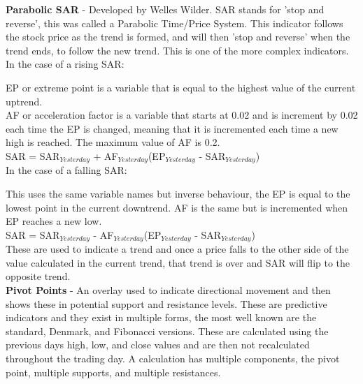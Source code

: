 \documentclass[12pt,a4paper]{article}
\begin{document}
\iffalse
[]
\fi

\noindent
\textbf{Parabolic SAR} - Developed by Welles Wilder. SAR stands for 'stop and reverse', this was called a Parabolic Time/Price System. This indicator follows the stock price as the trend is formed, and will then 'stop and reverse' when the trend ends, to follow the new trend. This is one of the more complex indicators.\\

\noindent
In the case of a rising SAR:

\noindent
EP or extreme point is a variable that is equal to the highest value of the current uptrend.\\
AF or acceleration factor is a variable that starts at 0.02 and is increment by 0.02 each time the EP is changed, meaning that it is incremented each time a new high is reached. The maximum value of AF is 0.2. \\

\noindent
SAR = SAR$_{Yesterday}$ + AF$_{Yesterday}$(EP$_{Yesterday}$ - SAR$_{Yesterday}$) \\

\noindent
In the case of a falling SAR:

\noindent
This uses the same variable names but inverse behaviour, the EP is equal to the lowest point in the current downtrend. AF is the same but is incremented when EP reaches a new low. \\

\noindent
SAR = SAR$_{Yesterday}$ - AF$_{Yesterday}$(EP$_{Yesterday}$ - SAR$_{Yesterday}$) \\

\noindent
These are used to indicate a trend and once a price falls to the other side of the value calculated in the current trend, that trend is over and SAR will flip to the opposite trend. \\

\iffalse
[]
\fi

\noindent
\textbf{Pivot Points} - An overlay used to indicate directional movement and then shows these in potential support and resistance levels. These are predictive indicators and they exist in multiple forms, the most well known are the standard, Denmark, and Fibonacci versions. These are calculated using the previous days high, low, and close values and are then not recalculated throughout the trading day. A calculation has multiple components, the pivot point, multiple supports, and multiple resistances.\\
\end{document}
